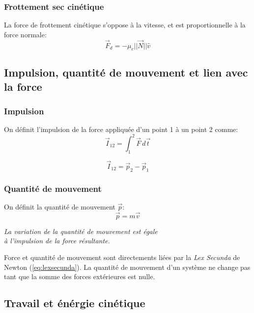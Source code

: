 \documentclass{article}
\numberwithin{equation}{section}
\begin{document}
\subsubsection{Frottement sec cinétique}
La force de frottement cinétique s'oppose à la vitesse, et est proportionnelle à la force normale:
\begin{equation}
	\boxed{ \vec F_d = - \mu_c ||\vec N|| \hat v }
\end{equation}

\subsection{Impulsion, quantité de mouvement et lien avec la force}

\subsubsection{Impulsion}
On définit l'impulsion de la force appliquée d'un point 1 à un point 2 comme:
\begin{equation}
	\boxed{ \vec I_{12} = \int_1^2 \vec F \, d \vec t }
\end{equation}

\begin{equation}
	\boxed{ \vec I_{12} = \vec p_2 - \vec p_1 }
\end{equation}

\subsubsection{Quantité de mouvement}
On définit la quantité de mouvement \(\vec p\):
\begin{equation}
	\boxed{ \vec p = m \vec v }
\end{equation}

\begin{center}
	\emph{La variation de la quantité de mouvement est égale \\ à l'impulsion de la force résultante.}
\end{center}

Force et quantité de mouvement sont directements liées par la \emph{Lex Secunda} de Newton (\ref{eq:lexsecunda}). La quantité de mouvement d'un système ne change pas tant que la somme des forces extérieures est nulle.

\subsection{Travail et énérgie cinétique}
\end{document}
